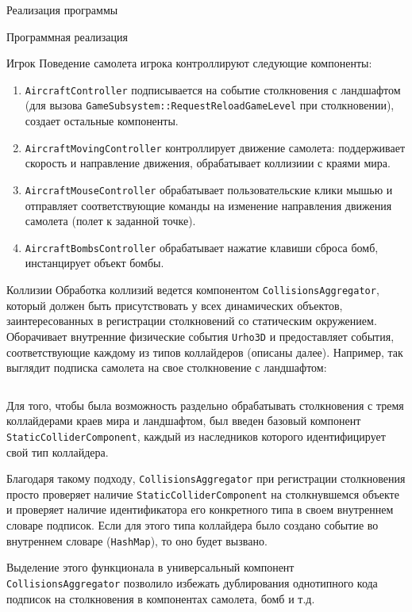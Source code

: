 \documentclass[a4paper, 14pt]{extarticle}
\numberwithin{equation}{section} %
\begin{document}
\begin{section}{Реализация программы}
\begin{subsection}{Программная реализация}
\begin{subsubsection}{Игрок}
Поведение самолета игрока контроллируют следующие компоненты:
\begin{enumerate}
\item \verb|AircraftController| подписывается на событие столкновения с ландшафтом (для вызова \verb|GameSubsystem::RequestReloadGameLevel| при столкновении), создает остальные компоненты.
\item \verb|AircraftMovingController| контроллирует движение самолета: поддерживает скорость и направление движения, обрабатывает коллизиии с краями мира.
\item \verb|AircraftMouseController| обрабатывает пользовательские клики мышью и отправляет соответствующие команды на изменение направления движения самолета (полет к заданной точке).
\item \verb|AircraftBombsController| обрабатывает нажатие клавиши сброса бомб, инстанцирует объект бомбы.
\end{enumerate}
\end{subsubsection}

\clearpage
\begin{subsubsection}{Коллизии}
Обработка коллизий ведется компонентом \verb|CollisionsAggregator|, который должен быть присутствовать у всех динамических объектов, заинтересованных в регистрации столкновений со статическим окружением.
Оборачивает внутренние физические события \verb|Urho3D| и предоставляет события, соответствующие каждому из типов коллайдеров (описаны далее).
Например, так выглядит подписка самолета на свое столкновение с ландшафтом:

\inputminted{cpp}{listings/AircraftCollisionExample.cpp}

Для того, чтобы была возможность раздельно обрабатывать столкновения с тремя коллайдерами краев мира и ландшафтом, был введен базовый компонент \verb|StaticColliderComponent|, каждый из наследников которого идентифицирует свой тип коллайдера.

Благодаря такому подходу, \verb|CollisionsAggregator| при регистрации столкновения просто проверяет наличие \verb|StaticColliderComponent| на столкнувшемся объекте и проверяет наличие идентификатора его конкретного типа в своем внутреннем словаре подписок.
Если для этого типа коллайдера было создано событие во внутреннем словаре (\verb|HashMap|), то оно будет вызвано.

Выделение этого функционала в универсальный компонент \verb|CollisionsAggregator| позволило избежать дублирования однотипного кода подписок на столкновения в компонентах самолета, бомб и т.д.
\end{subsubsection}


\end{subsection}
\end{section}
\end{document}
